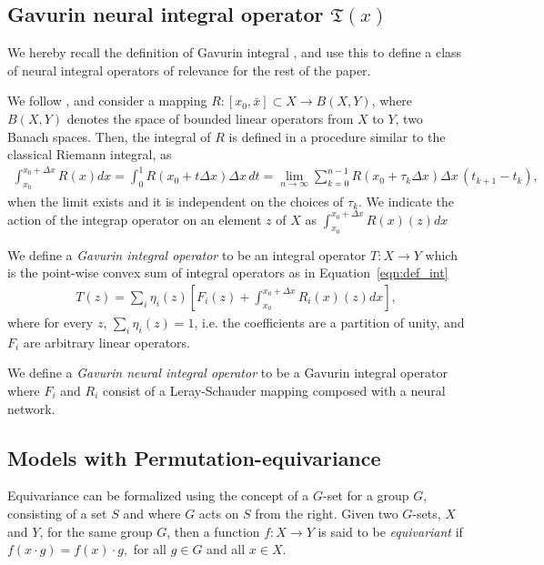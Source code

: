 \documentclass[a4paper,12pt,reqno]{amsart}
\theoremstyle{definition}
\theoremstyle{remark}
\begin{document}
\subsection{Gavurin neural integral operator $\mathfrak T(x)$}

We hereby recall the definition of Gavurin integral \cite{Gavurin}, and use this to define a class of neural integral operators of relevance for the rest of the paper. 

We follow \cites{kantorovich2016functional,Gavurin}, and consider a mapping $R: [x_0, \bar x]\subset X \to  B(X,Y)$, where $B(X,Y)$ denotes the space of bounded linear operators from $X$ to $Y$, two Banach spaces. Then, the integral of $R$ is defined in a procedure similar to the classical Riemann integral, as
    \begin{eqnarray}\label{eqn:def_int}
        \int_{x_0}^{x_0+\Delta x} R(x) dx = \int_0^1 R(x_0+t\Delta x) \Delta x \, dt = \lim_{n\to \infty} \sum\limits_{k=0}^{n-1} R(x_0+\tau_k\Delta x)\Delta x\,  (t_{k+1}-t_k),
    \end{eqnarray} 
when the limit exists and it is independent on the choices of $\tau_k$. We indicate the action of the integrap operator on an element $z$ of $X$ as $\int_{x_0}^{x_0+\Delta x} R(x)(z) dx$

We define a {\it Gavurin integral operator} to be an integral operator $T: X \longrightarrow Y$ which is the point-wise convex sum of integral operators as in Equation~\eqref{eqn:def_int}
\begin{eqnarray}\label{eqn:Gavurin_operator}
    T(z) = \sum_i \eta_i(z)[F_i(z) + \int_{x_0}^{x_0+\Delta x} R_i(x)(z) dx],
\end{eqnarray}
where for every $z$, $\sum_i \eta_i(z) = 1$, i.e. the coefficients are a partition of unity, and $F_i$ are arbitrary linear operators. 

We define a {\it Gavurin neural integral operator} to be a Gavurin integral operator where $F_i$ and $R_i$ consist of a Leray-Schauder mapping composed with a neural network. 

\subsection{Models with Permutation-equivariance}
Equivariance can be formalized using the concept of a $G$-set for a group $G$, consisting of a set $S$ and where $G$ acts on $S$ from the right. Given two $G$-sets, $X$ and $Y$, for the same group $G$, then a function $f : X \to Y$ is said to be \textit{equivariant} if \(
f(x \cdot g) = f(x) \cdot g,\)
for all $g \in G$ and all $x \in X$.
\end{document}
